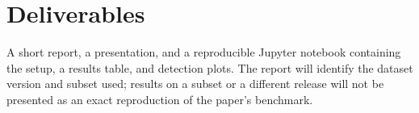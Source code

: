 \section*{Deliverables}
A short report, a presentation, and a reproducible Jupyter notebook containing the setup, a results table, and detection plots.
The report will identify the dataset version and subset used; results on a subset or a different release will not be presented as an exact reproduction of the paper's benchmark.
